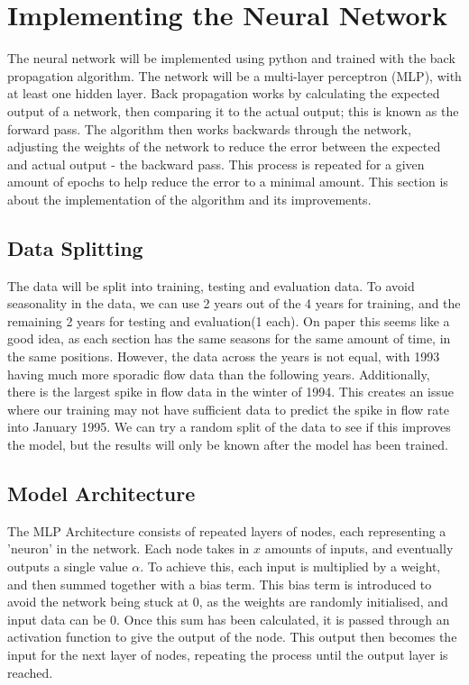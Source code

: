 \documentclass{report}
\begin{document}
\chapter{Implementing the Neural Network}
The neural network will be implemented using python and trained with the back propagation algorithm.
The network will be a multi-layer perceptron (MLP), with at least one hidden layer.
\vspace{1em}
\newline
Back propagation works by calculating the expected output of a network, then comparing it to the actual output; this is known as the forward pass.
The algorithm then works backwards through the network, adjusting the weights of the network to reduce the error between the expected and actual output - the backward pass.
This process is repeated for a given amount of epochs to help reduce the error to a minimal amount. 
This section is about the implementation of the algorithm and its improvements.
\section{Data Splitting}
The data will be split into training, testing and evaluation data.
To avoid seasonality in the data, we can use 2 years out of the 4 years for training, and the remaining 2 years for testing and evaluation(1 each).
On paper this seems like a good idea, as each section has the same seasons for the same amount of time, in the same positions.
\vspace{1em}
\newline
However, the data across the years is not equal, with 1993 having much more sporadic flow data than the following years.
Additionally, there is the largest spike in flow data in the winter of 1994.
This creates an issue where our training may not have sufficient data to predict the spike in flow rate into January 1995.
We can try a random split of the data to see if this improves the model, but the results will only be known after the model has been trained.
\section{Model Architecture}
The MLP Architecture consists of repeated layers of nodes, each representing a 'neuron' in the network.
Each node takes in $x$ amounts of inputs, and eventually outputs a single value $\alpha$.
\newline
To achieve this, each input is multiplied by a weight, and then summed together with a bias term.
This bias term is introduced to avoid the network being stuck at 0, as the weights are randomly initialised, and input data can be 0.
Once this sum has been calculated, it is passed through an activation function to give the output of the node.
\vspace{1em}
\newline
This output then becomes the input for the next layer of nodes, repeating the process until the output layer is reached.
\end{document}
